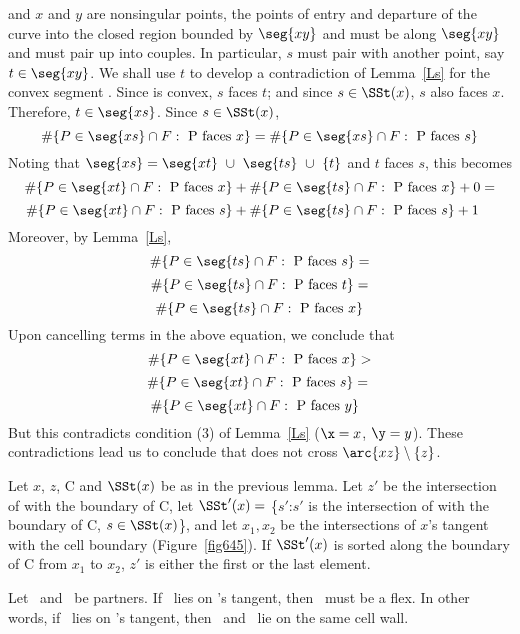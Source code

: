 and $x$ and $y$ are nonsingular points,
the points of entry and departure of the curve into
the closed region bounded by $\seg{xy}$ and 
must be along $\seg{xy}$ and must pair up into couples.
In particular, $s$ must pair with another point, say $t \in \seg{xy}$.
We shall use $t$ to develop a contradiction of Lemma~\ref{Ls} for the convex 
segment .
Since  is convex, $s$ faces $t$; and since $s \in \SSt(x)$, $s$ also faces $x$. 
Therefore, $t \in \seg{xs}$.
Since \mbox{$s \in \SSt(x)$}, 
\[ \#\{P \in \seg{xs} \cap F: \mbox{ P faces $x$}\}
= \#\{P \in \seg{xs} \cap F: \mbox{ P faces $s$}\} \]
Noting that $\seg{xs} = \seg{xt}\ \cup\ \seg{ts}\ \cup\ \{t\}$ and 
$t$ faces $s$, this becomes 
\[ \#\{P \in \seg{xt} \cap F: \mbox{ P faces $x$}\} +
\#\{P \in \seg{ts} \cap F: \mbox{ P faces $x$}\} + 0 =  \]
\nopagebreak
\[ \#\{P \in \seg{xt} \cap F: \mbox{ P faces $s$}\} +
\#\{P \in \seg{ts} \cap F: \mbox{ P faces $s$}\} + 1\ \ \  \]
Moreover, by Lemma~\ref{Ls},
\[ \#\{P \in \seg{ts} \cap F: \mbox{ P faces $s$}\} = \]
\[ \#\{P \in \seg{ts} \cap F: \mbox{ P faces $t$}\} = \]
\[ \#\{P \in \seg{ts} \cap F: \mbox{ P faces $x$} \} \]
Upon cancelling terms in the above equation, we conclude that
\[ \#\{P \in \seg{xt} \cap F: \mbox{ P faces $x$}\} > \]
\[ \#\{P \in \seg{xt} \cap F: \mbox{ P faces $s$}\} =\  \]
\[ \#\{P \in \seg{xt} \cap F: \mbox{ P faces $y$}\}\ \  \]
But this contradicts condition (3) of Lemma~\ref{Ls} 
($\x = x$, $\y = y$).
These contradictions lead us to conclude that  does not cross 
$\arc{xz} \setminus \{z\}$.
\QED


\begin{corollary}
\label{cor-645}
Let $x$, $z$, C and $\SSt(x)$ be as in the previous lemma.
Let $z'$ be the intersection of  with the boundary of C,
let $\SSt'(x) =$ \{$s'$:$s'$ is the intersection of  with the 
boundary of C, $s \in \SSt(x)$\},
and let $x_{1},x_{2}$ be the intersections of $x$'s tangent with the cell boundary
(Figure~\ref{fig645}).
If $\SSt'(x)$ is sorted along the boundary of C from $x_{1}$ to $x_{2}$,
$z'$ is either the first or the last element.
\end{corollary}

\begin{lemma}[{\cite[p. 119]{jj}}]   %
\label{Ll}
Let \wo\ and \wt\ be partners.
If \wt\ lies on \wo's tangent, then \wo\ must be a flex.
In other words, if \wt\ lies on \wo's tangent, 
then \wo\ and \wt\ lie on the same cell wall.
\end{lemma}


